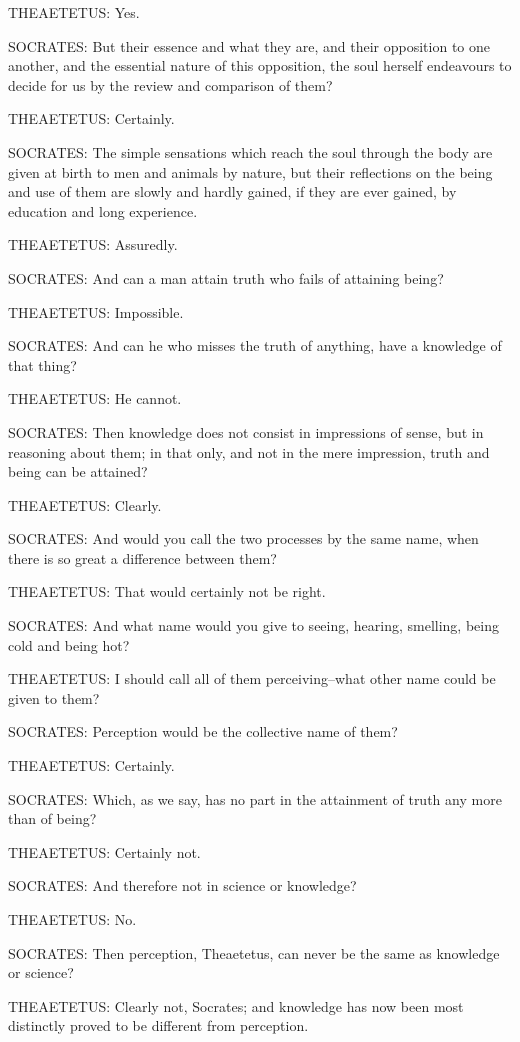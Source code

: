 THEAETETUS: Yes.

SOCRATES: But their essence and what they are, and their opposition
to one another, and the essential nature of this opposition, the soul
herself endeavours to decide for us by the review and comparison of
them?

THEAETETUS: Certainly.

SOCRATES: The simple sensations which reach the soul through the body
are given at birth to men and animals by nature, but their reflections
on the being and use of them are slowly and hardly gained, if they are
ever gained, by education and long experience.

THEAETETUS: Assuredly.

SOCRATES: And can a man attain truth who fails of attaining being?

THEAETETUS: Impossible.

SOCRATES: And can he who misses the truth of anything, have a knowledge
of that thing?

THEAETETUS: He cannot.

SOCRATES: Then knowledge does not consist in impressions of sense, but
in reasoning about them; in that only, and not in the mere impression,
truth and being can be attained?

THEAETETUS: Clearly.

SOCRATES: And would you call the two processes by the same name, when
there is so great a difference between them?

THEAETETUS: That would certainly not be right.

SOCRATES: And what name would you give to seeing, hearing, smelling,
being cold and being hot?

THEAETETUS: I should call all of them perceiving--what other name could
be given to them?

SOCRATES: Perception would be the collective name of them?

THEAETETUS: Certainly.

SOCRATES: Which, as we say, has no part in the attainment of truth any
more than of being?

THEAETETUS: Certainly not.

SOCRATES: And therefore not in science or knowledge?

THEAETETUS: No.

SOCRATES: Then perception, Theaetetus, can never be the same as
knowledge or science?

THEAETETUS: Clearly not, Socrates; and knowledge has now been most
distinctly proved to be different from perception.

